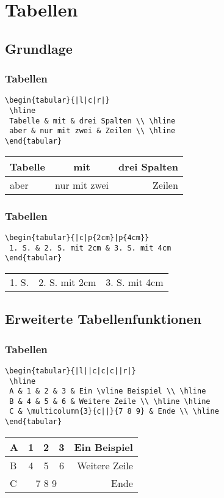 \section{Tabellen}

\subsection{Grundlage}
\begin{frame}[fragile]
\frametitle{Tabellen}
\begin{verbatim}
\begin{tabular}{|l|c|r|}
 \hline
 Tabelle & mit & drei Spalten \\ \hline
 aber & nur mit zwei & Zeilen \\ \hline
\end{tabular}
\end{verbatim}
\pause
  
    \begin{tabular}{|l|c|r|}\hline
      Tabelle & mit & drei Spalten \\\hline
      aber & nur mit zwei & Zeilen \\\hline
    \end{tabular}
\end{frame}

\begin{frame}[fragile]
\frametitle{Tabellen}
\begin{verbatim}
\begin{tabular}{|c|p{2cm}|p{4cm}}
 1. S. & 2. S. mit 2cm & 3. S. mit 4cm
\end{tabular}
\end{verbatim}
\pause
    \begin{tabular}{|c|p{2cm}|p{4cm}}
      1. S. & 2. S. mit 2cm & 3. S. mit 4cm
    \end{tabular}
\end{frame}

\subsection{Erweiterte Tabellenfunktionen}
\begin{frame}[fragile]
\frametitle{Tabellen}
\begin{verbatim}  
\begin{tabular}{|l||c|c|c||r|}
 \hline
 A & 1 & 2 & 3 & Ein \vline Beispiel \\ \hline
 B & 4 & 5 & 6 & Weitere Zeile \\ \hline \hline
 C & \multicolumn{3}{c||}{7 8 9} & Ende \\ \hline
\end{tabular}
\end{verbatim}
  \begin{tabular}{|l||c|c|c||r|}
    \hline
    A & 1 & 2 & 3 & Ein \vline Beispiel \\\hline
    B & 4 & 5 & 6 & Weitere Zeile \\\hline \hline
    C & \multicolumn{3}{c||}{7 8 9} & Ende \\\hline
  \end{tabular}
\end{frame}

